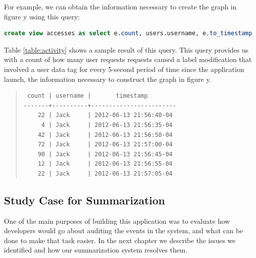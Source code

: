 For example, we can obtain the information necessary to create the graph in figure y using this query:

\begin{lstlisting}[language=SQL, deletendkeywords={TIMESTAMP}, label=query:accesses]
create view accesses as select e.count, users.username, e.to_timestamp as timestamp from (select count(*), tags_modified, (to_timestamp(((extract (epoch from events.timestamp)/5)::int)*5)) from events tags_modified in (select tag from users) group by (to_timestamp(((extract (epoch from events.timestamp)/5)::int)*5)), tags_modified) as e inner join users on e.tags_modified=users.tag
\end{lstlisting}

Table \ref{table:activity} shows a sample result of this query. This query provides us with a count of how many user requests requests caused a label modification that involved a user data tag for every 5-second period of time since the application launch, the information necessary to construct the graph in figure y.

\begin{table}
\begin{quote}
\begin{verbatim}
 count | username |       timestamp        
-------+----------+------------------------
    22 | Jack     | 2012-06-13 21:56:40-04
     4 | Jack     | 2012-06-13 21:56:35-04
    42 | Jack     | 2012-06-13 21:56:50-04
    72 | Jack     | 2012-06-13 21:57:00-04
    90 | Jack     | 2012-06-13 21:56:45-04
    12 | Jack     | 2012-06-13 21:56:55-04
    22 | Jack     | 2012-06-13 21:57:05-04
\end{verbatim}
\end{quote}
\caption*{Account activity for user \emph{Jack}}
\caption{This table shows a sample result of the \emph{accesses} view (for simplicity we only show the result for the user Jack). It details the number of user requests causing a label manipulation involving a user data tag for every 5-second period since the application launched. The \emph{count} denotes such number. The \emph{username} column denotes the user who's data tag is in question. The \emph{timestamp} column denotes the start of the 5-second period.}
\label{table:activity}
\end{table}

\subsection{Study Case for Summarization}

One of the main purposes of building this application was to evaluate how developers would go about auditing the events in the system, and what can be done to make that task easier. In the next chapter we describe the issues we identified and how our summarization system resolves them.
